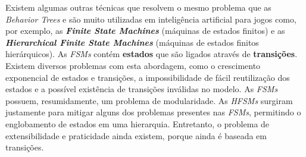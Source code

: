 Existem algumas outras técnicas que resolvem o mesmo problema que as
\textit{Behavior Trees} e são muito utilizadas em inteligência artificial para
jogos como, por exemplo, as \textbf{\textit{Finite State Machines}} (máquinas de
estados finitos) e as \textbf{\textit{Hierarchical Finite State Machines}}
(máquinas de estados finitos hierárquicos). As \textit{FSMs} contém
\textbf{estados} que são ligados através de \textbf{transições}. Existem
diversos problemas com esta abordagem, como o crescimento exponencial de estados
e transições, a impossibilidade de fácil reutilização dos estados e a possível
existência de transições inválidas no modelo. As \textit{FSMs} possuem,
resumidamente, um problema de modularidade. As \textit{HFSMs} surgiram
justamente para mitigar alguns dos problemas presentes nas \textit{FSMs},
permitindo o englobamento de estados em uma hierarquia. Entretanto, o problema
de extensibilidade e praticidade ainda existem, porque ainda é baseada em
transições.
